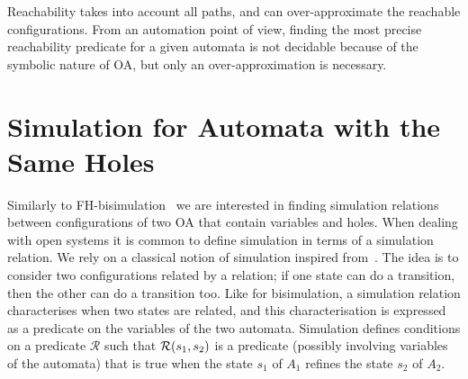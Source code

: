 \documentclass[runningheads]{llncs}
\begin{document}
Reachability takes into account all paths, and can over-approximate the reachable configurations. 
From an automation point of view, finding the most precise reachability predicate for a given automata is not decidable because of the symbolic nature of OA, but only an over-approximation is necessary.


\section{Simulation  for Automata with the Same Holes}\label{sec:refinement}

Similarly to FH-bisimulation~\cite{AMHEEMA:2023} we are interested  in finding simulation relations between configurations of two OA that contain variables and holes. When dealing with open systems it is common to define simulation in terms of a simulation relation.
We rely on a classical notion of simulation inspired from~\cite{AMHEEMA:2023}. The idea is to consider two configurations related by a relation; if one state can do a transition, then the other can do a transition too. 
Like for bisimulation, a simulation relation characterises when two states are related, and this  characterisation is expressed as a predicate on the variables of the two automata.
Simulation defines conditions on a predicate $\mathcal{R}$ such that $\mathcal{R}{\left(s_1, s_2\right)}$ is a predicate (possibly involving variables of the automata) that is true when the state $s_1$ of $A_1$ refines the state $s_2$ of $A_2$.



%
\end{document}
